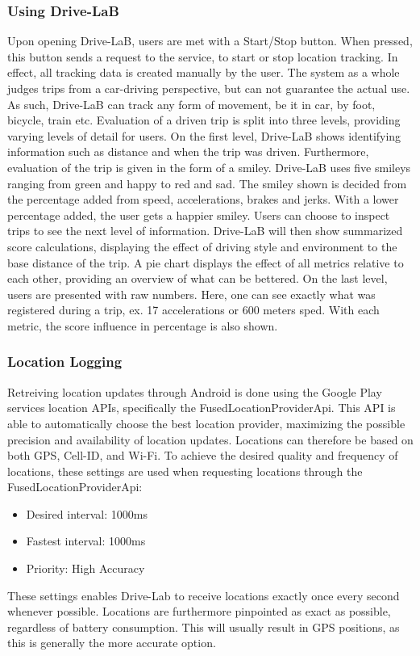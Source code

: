 \subsubsection{Using Drive-LaB}
Upon opening Drive-LaB, users are met with a Start/Stop button. When pressed, this button sends a request to the service, to start or stop location tracking. In effect, all tracking data is created manually by the user. The system as a whole judges trips from a car-driving perspective, but can not guarantee the actual use. As such, Drive-LaB can track any form of movement, be it in car, by foot, bicycle, train etc.
Evaluation of a driven trip is split into three levels, providing varying levels of detail for users. On the first level, Drive-LaB shows identifying information such as distance and when the trip was driven. Furthermore, evaluation of the trip is given in the form of a smiley. Drive-LaB uses five smileys ranging from green and happy to red and sad. The smiley shown is decided from the percentage added from speed, accelerations, brakes and jerks. With a lower percentage added, the user gets a happier smiley.
Users can choose to inspect trips to see the next level of information. Drive-LaB will then show summarized score calculations, displaying the effect of driving style and environment to the base distance of the trip. A pie chart displays the effect of all metrics relative to each other, providing an overview of what can be bettered.
On the last level, users are presented with raw numbers. Here, one can see exactly what was registered during a trip, ex. 17 accelerations or 600 meters sped. With each metric, the score influence in percentage is also shown.

\subsubsection{Location Logging}
Retreiving location updates through Android is done using the Google Play services location APIs, specifically the FusedLocationProviderApi. This API is able to automatically choose the best location provider, maximizing the possible precision and availability of location updates. Locations can therefore be based on both GPS, Cell-ID, and Wi-Fi. To achieve the desired quality and frequency of locations, these settings are used when requesting locations through the FusedLocationProviderApi:

\begin{itemize}
\item Desired interval: 1000ms
\item Fastest interval: 1000ms
\item Priority: High Accuracy
\end{itemize}

These settings enables Drive-Lab to receive locations exactly once every second whenever possible. Locations are furthermore pinpointed as exact as possible, regardless of battery consumption. This will usually result in GPS positions, as this is generally the more accurate option.